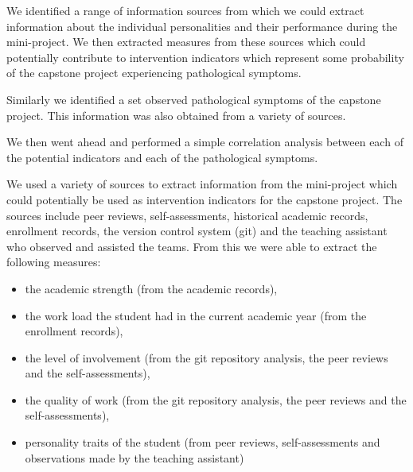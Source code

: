 We identified a range of information sources from which we could extract information about the individual personalities and their performance during the mini-project. We then extracted measures from these sources which could potentially contribute to intervention indicators which represent some probability of the capstone project experiencing pathological symptoms.


Similarly we identified a set observed pathological symptoms of the capstone project. This information was also obtained from a variety of sources.

We then went ahead and performed a simple correlation analysis between each of the potential indicators and each of the pathological symptoms. 


We used a variety of sources to extract information from the mini-project which could potentially be used as intervention indicators for the capstone project. The sources include peer reviews, self-assessments, historical academic records, enrollment records, the version control system (git) and the teaching assistant who observed and assisted the teams. From this we were able to extract the following measures:
\begin{itemize}
  \item the academic strength (from the academic records),
  \item the work load the student had in the current academic year (from the enrollment records),
  \item the level of involvement (from the git repository analysis, the peer reviews and the self-assessments),
  \item the quality of work (from the git repository analysis, the peer reviews and the self-assessments),
  \item personality traits of the student (from peer reviews, self-assessments and observations made by the teaching assistant)
\end{itemize}

